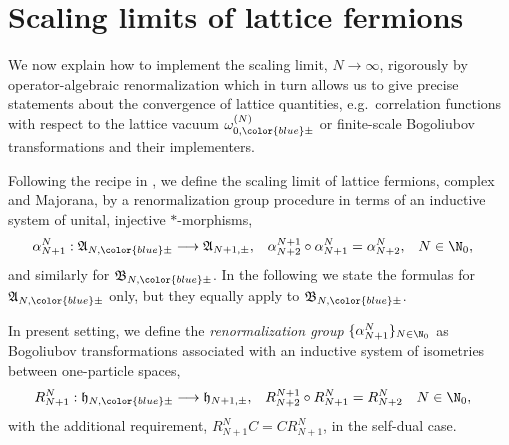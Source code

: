 \documentclass[a4paper, 11pt]{article}
\newcommand{\fA}{\mathfrak{A}}\newcommand{\cA}{\mathcal{A}}\newcommand{\dA}{\mathds{A}}\newcommand{\sA}{\mathscr{A}}
\newcommand{\fB}{\mathfrak{B}}\newcommand{\cB}{\mathcal{B}}\newcommand{\dB}{\mathds{B}}\newcommand{\sB}{\mathscr{B}}
\newcommand{\fh}{\mathfrak{h}}
\DeclareMathOperator{\1}{\mathds{1}}
\begin{document}
\section{Scaling limits of lattice fermions}
\label{sec:ffscaling}
We now explain how to implement the scaling limit, $N\rightarrow\infty$, rigorously by operator-algebraic renormalization \cite{StottmeisterOperatorAlgebraicRenormalization, BrothierAnOperatorAlgebraic} which in turn allows us to give precise statements about the convergence of lattice quantities, e.g.~correlation functions with respect to the lattice vacuum $\omega^{(N)}_{0,{\color{blue}\pm}}$ or finite-scale Bogoliubov transformations and their implementers.

Following the recipe in \cite{MorinelliScalingLimitsOf}, we define the scaling limit of lattice fermions, complex and Majorana, by a renormalization group procedure in terms of an inductive system of unital, injective $*$-morphisms,
\begin{align}
\label{eq:rgF}
\alpha^{N}_{N+1} : \fA_{N,{\color{blue}\pm}} & \longrightarrow \fA_{N+1,\pm}, & \alpha^{N+1}_{N+2}\circ\alpha^{N}_{N+1} & = \alpha^{N}_{N+2} , & N & \in\N_{0},
\end{align}
and similarly for $\fB_{N,{\color{blue}\pm}}$. In the following we state the formulas for $\fA_{N,{\color{blue}\pm}}$ only, but they equally apply to $\fB_{N,{\color{blue}\pm}}$.

In present setting, we define the \textit{renormalization group} $\{\alpha^{N}_{N+1}\}_{N\in\N_{0}}$ as Bogoliubov transformations associated with an inductive system of isometries between one-particle spaces,
\begin{align}
\label{eq:rgH}
R^{N}_{N+1} : \fh_{N,{\color{blue}\pm}} & \longrightarrow \fh_{N+1,\pm}, & R^{N+1}_{N+2}\circ R^{N}_{N+1} & = R^{N}_{N+2} & N & \in\N_{0},
\end{align}
with the additional requirement, $R^{N}_{N+1}C = CR^{N}_{N+1}$, in the self-dual case.
\end{document}
